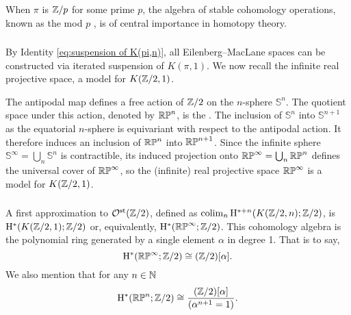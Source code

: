When $\pi$ is $\mathbb{Z}/p$ for some prime $p$, the algebra of stable cohomology operations, known as the mod $p$ , is of central importance in homotopy theory.

%


\subsubsection{} By Identity \eqref{eq:suspension of K(pi,n)}, all Eilenberg--MacLane spaces can be constructed via iterated suspension of $K(\pi,1)$.
We now recall the infinite real projective space, a model for $K(\mathbb{Z}/2, 1)$.

The antipodal map defines a free action of $\mathbb{Z}/2$ on the $n$-sphere \(\mathbb{S}^n\).
The quotient space under this action, denoted by \(\mathbb{RP}^n\), is the .
The inclusion of \(\mathbb{S}^n\) into \(\mathbb{S}^{n+1}\) as the equatorial $n$-sphere is equivariant with respect to the antipodal action.
It therefore induces an inclusion of \(\mathbb{RP}^n\) into \(\mathbb{RP}^{n+1}\).
Since the infinite sphere \(\mathbb{S}^\infty = \bigcup_n \mathbb{S}^n\) is contractible, its induced projection onto $\mathbb{RP}^\infty = \bigcup_n \mathbb{RP}^n$ defines the universal cover of \(\mathbb{RP}^\infty\), so the (infinite) real projective space $\mathbb{RP}^\infty$ is a model for \(K(\mathbb{Z}/2, 1)\).

\subsubsection{} A first approximation to $\mathcal{O}^{\mathrm{st}}(\mathbb{Z}/2)$, defined as $\operatorname*{colim}_n \mathrm{H}^{\ast + n}(K(\mathbb{Z}/2, n); \mathbb{Z}/2)$, is $\mathrm{H}^\ast(K(\mathbb{Z}/2, 1); \mathbb{Z}/2)$ or, equivalently, $\mathrm{H}^\ast(\mathbb{RP}^\infty; \mathbb{Z}/2)$.
This cohomology algebra is the polynomial ring generated by a single element $\alpha$ in degree 1.
That is to say,
\[
\mathrm{H}^\ast(\mathbb{RP}^\infty; \mathbb{Z}/2) \cong (\mathbb{Z}/2)[\alpha].
\]
We also mention that for any $n \in \mathbb{N}$
\[
\mathrm{H}^\ast(\mathbb{RP}^n; \mathbb{Z}/2) \cong \frac{(\mathbb{Z}/2)[\alpha]}{(\alpha^{n+1} = 1)}.
\]

